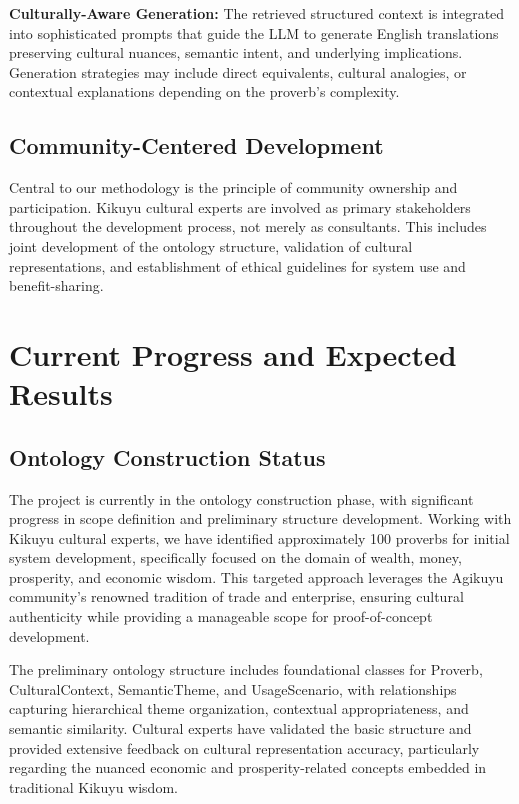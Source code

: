 \documentclass[
]{ceurart}
\begin{document}
\textbf{Culturally-Aware Generation:} The retrieved structured context is integrated into sophisticated prompts that guide the LLM to generate English translations preserving cultural nuances, semantic intent, and underlying implications. Generation strategies may include direct equivalents, cultural analogies, or contextual explanations depending on the proverb's complexity.

\subsection{Community-Centered Development}

Central to our methodology is the principle of community ownership and participation. Kikuyu cultural experts are involved as primary stakeholders throughout the development process, not merely as consultants. This includes joint development of the ontology structure, validation of cultural representations, and establishment of ethical guidelines for system use and benefit-sharing.

\section{Current Progress and Expected Results}

\subsection{Ontology Construction Status}

The project is currently in the ontology construction phase, with significant progress in scope definition and preliminary structure development. Working with Kikuyu cultural experts, we have identified approximately 100 proverbs for initial system development, specifically focused on the domain of wealth, money, prosperity, and economic wisdom. This targeted approach leverages the Agikuyu community's renowned tradition of trade and enterprise, ensuring cultural authenticity while providing a manageable scope for proof-of-concept development.

The preliminary ontology structure includes foundational classes for Proverb, CulturalContext, SemanticTheme, and UsageScenario, with relationships capturing hierarchical theme organization, contextual appropriateness, and semantic similarity. Cultural experts have validated the basic structure and provided extensive feedback on cultural representation accuracy, particularly regarding the nuanced economic and prosperity-related concepts embedded in traditional Kikuyu wisdom.
\end{document}
